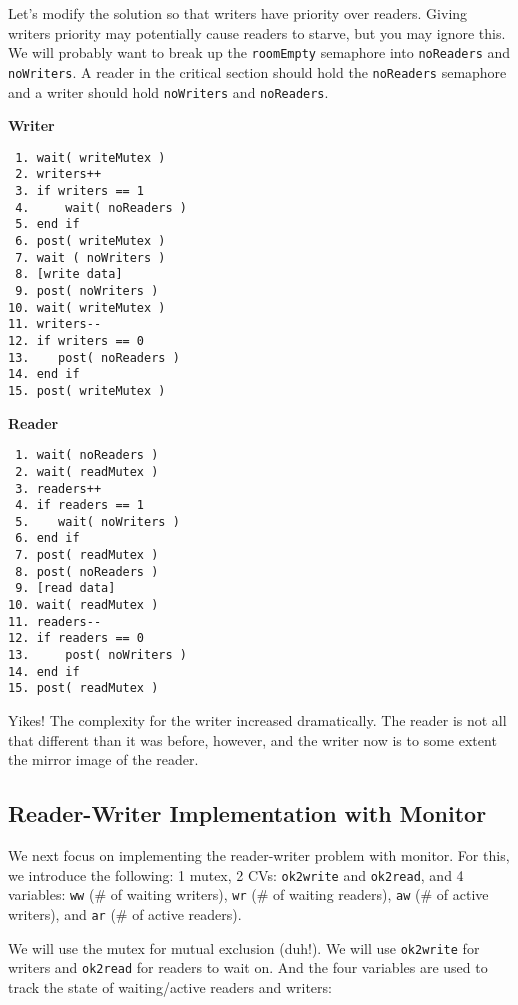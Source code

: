 Let's modify the solution so that writers have priority over readers. Giving writers priority may potentially cause readers to starve, but you may ignore this. We will probably want to break up the \texttt{roomEmpty} semaphore into \texttt{noReaders} and \texttt{noWriters}. A reader in the critical section should hold the \texttt{noReaders} semaphore and a writer should hold \texttt{noWriters} and \texttt{noReaders}.

\begin{multicols}{2}
    \textbf{Writer}\vspace{-2em}
    \begin{verbatim}
 1. wait( writeMutex )
 2. writers++
 3. if writers == 1
 4.     wait( noReaders )
 5. end if
 6. post( writeMutex )
 7. wait ( noWriters )
 8. [write data]
 9. post( noWriters )
10. wait( writeMutex )
11. writers--
12. if writers == 0
13.    post( noReaders )
14. end if
15. post( writeMutex )
    \end{verbatim}
    \columnbreak
    \textbf{Reader}\vspace{-2em}
    \begin{verbatim}
 1. wait( noReaders )
 2. wait( readMutex )
 3. readers++
 4. if readers == 1
 5.    wait( noWriters )
 6. end if
 7. post( readMutex )
 8. post( noReaders )
 9. [read data]
10. wait( readMutex )
11. readers--
12. if readers == 0
13.     post( noWriters )
14. end if
15. post( readMutex )
    \end{verbatim}
\end{multicols}
\vspace{-2em}

Yikes! The complexity for the writer increased dramatically. The reader is not all that different than it was before, however, and the writer now is to some extent the mirror image of the reader.

\newpage
\subsection*{Reader-Writer Implementation with Monitor}

We next focus on implementing the reader-writer problem with monitor.
For this, we introduce the following: 1 mutex, 2 CVs: \texttt{ok2write} and \texttt{ok2read}, and 4 variables: \texttt{ww} (\# of waiting writers), \texttt{wr} (\# of waiting readers), \texttt{aw} (\# of active writers), and \texttt{ar} (\# of active readers).

We will use the mutex for mutual exclusion (duh!).
We will use \texttt{ok2write} for writers and \texttt{ok2read} for readers to wait on.
And the four variables are used to track the state of waiting/active readers and writers:

